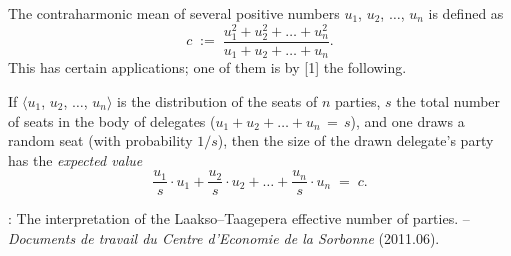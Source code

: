 \documentclass[12pt]{article}
\begin{document}
The contraharmonic mean of several positive numbers 
$u_1$, $u_2$, $\ldots$, $u_n$  is defined as
$$c \;:=\; \frac{u_1^2\!+\!u_2^2\!+\ldots+\!u_n^2}{u_1\!+\!u_2\!+\ldots+\!u_n}.$$                                        
This  has certain applications; one 
of them is by [1] the following.

If $\langle u_1$, $u_2$, $\ldots$, $u_n\rangle$ is the distribution of the seats of $n$ parties, 
$s$ the total number of seats in the body of delegates 
($u_1\!+\!u_2\!+\ldots+\!u_n\,=\,s$), 
and one draws a random seat (with probability $1/s$), then the size of the drawn 
delegate{'}s party has the {\it expected value}
$$\frac{u_1}{s}\!\cdot\!u_1+\frac{u_2}{s}\!\cdot\!u_2+\ldots+\frac{u_n}{s}\!\cdot\!u_n 
\;=\; c.$$

\begin{thebibliography}{8}
:  The interpretation of the Laakso{--}Taagepera effective number of parties.\;   {--} {\it Documents de travail du Centre d{'}Economie de la Sorbonne} (2011.06).
\end{thebibliography}
\end{document}
